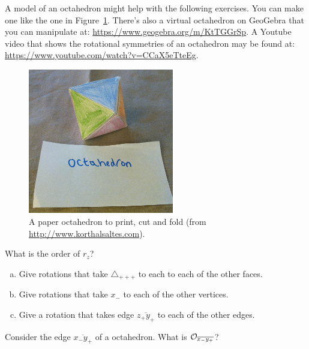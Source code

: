 A model of an octahedron might help with the following exercises.  You can make one like the one in Figure~\ref{fig:OctaFold}. There's also a virtual octahedron on GeoGebra that you can manipulate at: 
\url{https://www.geogebra.org/m/KtTGGrSp}.  A Youtube video that shows the rotational symmetries of an octahedron may be found at:
\url{https://www.youtube.com/watch?v=CCaX5eTteEg}.

\begin{figure}[ht]
\begin{center}
\includegraphics[width=2.5in]{images/OctahedronFold.png}
\caption{\label{fig:OctaFold} A paper octahedron to print, cut and fold
 (from \url{http://www.korthalsaltes.com}). }

\end{center}
\end{figure}

\begin{exercise}\label{exercise:actions:Octa2}
What is the order of $r_z$?
\end{exercise}

\begin{exercise}\label{exercise:actions:Octa3}
\begin{enumerate}[(a)]
\item Give rotations that take $\triangle _{+++}$ to each to each of the other faces.
\item Give rotations that take  $x_-$ to each of the other vertices.
\item Give a rotation that takes edge $\overline{z_+y_+}$ to each of the other edges.
\end{enumerate}
\end{exercise} 
\begin{exercise}\label{exercise:actions:Octa4}
Consider the edge $\overline{x_-y_+}$ of a octahedron. What is ${\cal O}_{\overline{x_-y_+}}$?
\end{exercise}

